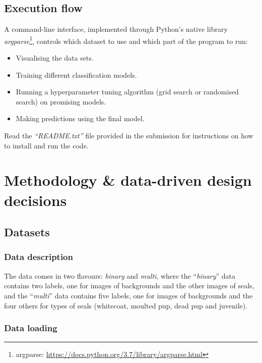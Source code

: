 \documentclass[letterpaper,12pt]{article}
\begin{document}
\subsection{Execution flow}

A command-line interface, implemented through Python’s native library \textit{argparse}\footnote{argparse: \url{https://docs.python.org/3.7/library/argparse.html}}, controls which dataset to use and which part of the program to run:
\begin{itemize}
    \item Visualising the data sets.
    \item Training different classification models.
    \item Running a hyperparameter tuning algorithm (grid search or randomised search) on promising models.
    \item Making predictions using the final model.
\end{itemize}

Read the \textit{``README.txt''} file provided in the submission for instructions on how to install and run the code.


\section{Methodology \& data-driven design decisions}
\label{sec:methodology-design}

\subsection{Datasets}

\subsubsection{Data description}

The data comes in two flavours: \textit{binary} and \textit{multi}, where the ``\textit{binary}'' data contains two labels, one for images of backgrounds and the other images of seals, and  the ``\textit{multi}'' data contains five labels, one for images of backgrounds and the four others for types of seals (whitecoat, moulted pup, dead pup and juvenile).

\subsubsection{Data loading}
\label{sec:data-loading}
\end{document}
